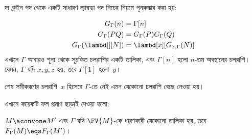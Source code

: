 \documentclass[../../../include/open-logic-section]{subfiles}
\begin{document}
দ্য ব্রুইন পদ থেকে একটি সাধারণ ল্যাম্বডা পদ নিচের নিয়মে পুনরুদ্ধার করা
হয়:

\begin{defn}
  \begin{align*}
    G_\Gamma(n) &= \Gamma[n] \\
    G_\Gamma(PQ) &= G_\Gamma(P) G_\Gamma(Q) \\
    G_\Gamma(\lambd[][N]) &= \lambd[x][G_{x,\Gamma}(N)]
  \end{align*}
  এখানে $\Gamma$ আবারও শূন্য থেকে সূচকিত চলরাশির একটি তালিকা, এবং
  $\Gamma[n]$ হলো $n$-তম অবস্থানের চলরাশি। যেমন, $\Gamma$ যদি $x,y,z$
  হয়, তবে $\Gamma[1]$ হলো~$y$।

  শেষ সমীকরণের চলরাশি~$x$ হিসেবে $\Gamma$-তে নেই এমন যেকোনো চলরাশি
  বেছে নেওয়া হয়।
\end{defn}

এখানে কয়েকটি ফল প্রমাণ ছাড়াই দেওয়া হলো:

\begin{prop}
  $M \aconvone M'$ এবং $\Gamma$ যদি $\FV{M}$-কে ধারণকারী যেকোনো তালিকা
  হয়, তবে $F_\Gamma(M) \eqs F_\Gamma(M')$।
\end{prop}
\end{document}
